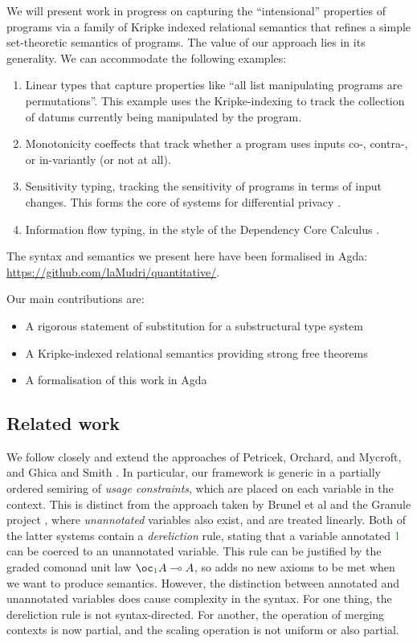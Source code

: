 We will present work in progress on capturing the ``intensional''
properties of programs via a family of Kripke indexed relational
semantics that refines a simple set-theoretic semantics of
programs. The value of our approach lies in its generality. We can
accommodate the following examples:
\begin{enumerate}
\item Linear types that capture properties like ``all list
  manipulating programs are permutations''. This example uses the
  Kripke-indexing to track the collection of datums currently being
  manipulated by the program.
\item Monotonicity coeffects that track whether a program uses inputs
  co-, contra-, or in-variantly (or not at all).
\item Sensitivity typing, tracking the sensitivity of programs in
  terms of input changes. This forms the core of systems for
  differential privacy \cite{reed10distance}.
\item Information flow typing, in the style of the Dependency Core
  Calculus \cite{abadi99core}.
\end{enumerate}

The syntax and semantics we present here have been formalised in Agda:
\url{https://github.com/laMudri/quantitative/}.

Our main contributions are:

\begin{itemize}
\item A rigorous statement of substitution for a substructural type system
\item A Kripke-indexed relational semantics providing strong free theorems
\item A formalisation of this work in Agda
\end{itemize}

\subsection{Related work}

We follow closely and extend the approaches of Petricek, Orchard, and Mycroft,
and Ghica and Smith \cite{PetricekOM14,GhicaS14}.
In particular, our framework is generic in a partially ordered semiring of
\emph{usage constraints}, which are placed on each variable in the context.
This is distinct from the approach taken by Brunel et al and the Granule project
\cite{BrunelGMZ14,Granule18}, where \emph{unannotated} variables also exist, and
are treated linearly.
Both of the latter systems contain a \emph{dereliction} rule, stating that a
variable annotated $\rescomment 1$ can be coerced to an unannotated variable.
This rule can be justified by the graded comonad unit law
$\fun{\excl{1}{A}}{A}$, so adds no new axioms to be met when we want to produce
semantics.
However, the distinction between annotated and unannotated variables does cause
complexity in the syntax.
For one thing, the dereliction rule is not syntax-directed.
For another, the operation of merging contexts is now partial, and the scaling
operation is not uniform or also partial.

